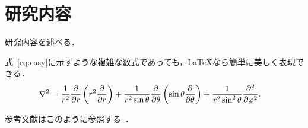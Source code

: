 \section{研究内容}\label{sec:研究内容}

研究内容を述べる．

式~\eqref{eq:easy}に示すような複雑な数式であっても，\LaTeX{}なら簡単に美しく表現できる．
\begin{align}\label{eq:easy}
  \nabla^2&=\frac{1}{r^2}\pdv{r}\left(r^2\pdv{r}\right)+\frac{1}{r^2\sin\theta}\pdv{\theta}\left(\sin\theta\pdv{\theta}\right)+\frac{1}{r^2\sin^2\theta}\pdv[2]{\varphi}.
\end{align}

参考文献はこのように参照する~\cite{竹下隆史2012マスタリング}．
